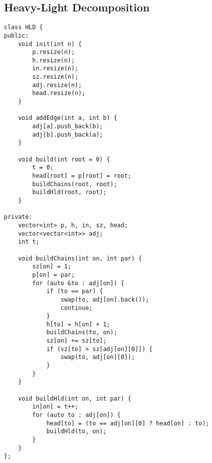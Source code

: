 \documentclass[12pt, a4paper, twoside]{article}
\begin{document}
\subsection{Heavy-Light Decomposition
}
\begin{lstlisting}
class HLD {
public:
	void init(int n) {
		p.resize(n);
		h.resize(n);
		in.resize(n);
		sz.resize(n);
		adj.resize(n);
		head.resize(n);
	}

	void addEdge(int a, int b) {
		adj[a].push_back(b);
		adj[b].push_back(a);
	}

	void build(int root = 0) {
		t = 0;
		head[root] = p[root] = root;
		buildChains(root, root);
		buildHld(root, root);
	}

private:
	vector<int> p, h, in, sz, head;
	vector<vector<int>> adj;
	int t;

	void buildChains(int on, int par) {
		sz[on] = 1;
		p[on] = par;
		for (auto &to : adj[on]) {
			if (to == par) {
				swap(to, adj[on].back());
				continue;
			}
			h[to] = h[on] + 1;
			buildChains(to, on);
			sz[on] += sz[to];
			if (sz[to] > sz[adj[on][0]]) {
				swap(to, adj[on][0]);
			}
		}
	}

	void buildHld(int on, int par) {
		in[on] = t++;
		for (auto to : adj[on]) {
			head[to] = (to == adj[on][0] ? head[on] : to);
			buildHld(to, on);
		}
	}
};
\end{lstlisting}
\end{document}
